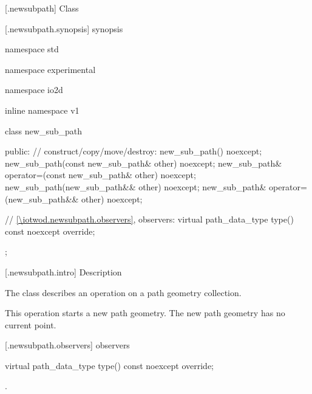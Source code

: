  [\iotwod.newsubpath] {Class }

 [\iotwod.newsubpath.synopsis] { synopsis}

\begin{codeblock}
namespace std { namespace experimental { namespace io2d { inline namespace v1 {
  class new_sub_path {
  public:
    // construct/copy/move/destroy:
    new_sub_path() noexcept;
    new_sub_path(const new_sub_path& other) noexcept;
    new_sub_path& operator=(const new_sub_path& other) noexcept;
    new_sub_path(new_sub_path&& other) noexcept;
    new_sub_path& operator=(new_sub_path&& other) noexcept;

    // \ref{\iotwod.newsubpath.observers}, observers:
    virtual path_data_type type() const noexcept override;
  };
} } } }
\end{codeblock}

 [\iotwod.newsubpath.intro] { Description}

\pnum
{}
The class  describes an operation on a path geometry collection.

\pnum
This operation starts a new path geometry. The new path geometry has no current point.

 [\iotwod.newsubpath.observers]{ observers}

\begin{itemdecl}
    virtual path_data_type type() const noexcept override;
\end{itemdecl}
\begin{itemdescr}
	\pnum
	\returns
	.

\end{itemdescr}
